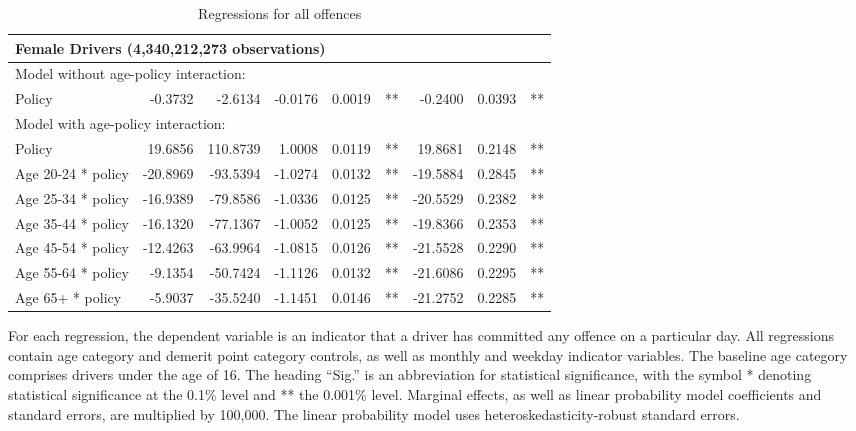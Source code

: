 \begin{table}
\begin{tabular}{l r r r r l r r l}
\hline 

\multicolumn{8}{l}{\textbf{Female Drivers} (4,340,212,273 observations)} \\ 

\hline
\multicolumn{8}{l}{Model without age-policy interaction: } \\ 
Policy                   &  -0.3732        &  -2.6134       &  -0.0176        &  0.0019       &   **       &  -0.2400        &  0.0393       &   **       \\ 
\hline
\multicolumn{8}{l}{Model with age-policy interaction: } \\ 
Policy                   &  19.6856        &  110.8739       &  1.0008        &  0.0119       &   **       &  19.8681        &  0.2148       &   **       \\ 
Age 20-24 * policy   &  -20.8969        &  -93.5394       &  -1.0274        &  0.0132       &   **       &  -19.5884        &  0.2845       &   **       \\ 
Age 25-34 * policy   &  -16.9389        &  -79.8586       &  -1.0336        &  0.0125       &   **       &  -20.5529        &  0.2382       &   **       \\ 
Age 35-44 * policy   &  -16.1320        &  -77.1367       &  -1.0052        &  0.0125       &   **       &  -19.8366        &  0.2353       &   **       \\ 
Age 45-54 * policy   &  -12.4263        &  -63.9964       &  -1.0815        &  0.0126       &   **       &  -21.5528        &  0.2290       &   **       \\ 
Age 55-64 * policy   &  -9.1354        &  -50.7424       &  -1.1126        &  0.0132       &   **       &  -21.6086        &  0.2295       &   **       \\ 
Age 65+ * policy   &  -5.9037        &  -35.5240       &  -1.1451        &  0.0146       &   **       &  -21.2752        &  0.2285       &   **       \\ 

\hline 

\end{tabular} 
\caption{Regressions for all offences} 
For each regression, the dependent variable is an indicator that a driver has committed  
any offence on a particular day.  
All regressions contain age category and demerit point category controls, 
as well as monthly and weekday indicator variables. 
The baseline age category comprises drivers under the age of 16. 
The heading ``Sig.'' is an abbreviation for statistical significance, with 
the symbol * denoting statistical significance at the 0.1\% level 
and ** the 0.001\% level. 
Marginal effects, as well as linear probability model coefficients and standard errors, are  
multiplied by 100,000.  
The linear probability model uses heteroskedasticity-robust standard errors. 
\label{tab:seas_Logit_vs_LPMx100K_regs} 
\end{table} 
 
